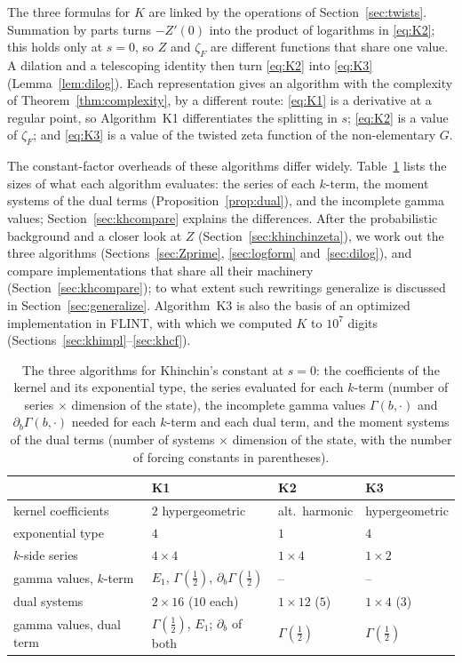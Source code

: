 \documentclass[11pt,reqno]{amsart}
\theoremstyle{definition}
\theoremstyle{remark}
\begin{document}
The three formulas for $K$ are linked by the operations of Section~\ref{sec:twists}.
Summation by parts turns $-Z'(0)$ into the product of logarithms in \eqref{eq:K2}; this holds only at $s = 0$, so $Z$
and $\zeta_F$ are different functions that share one value. A dilation and a telescoping identity then turn
\eqref{eq:K2} into \eqref{eq:K3} (Lemma~\ref{lem:dilog}). Each representation gives an algorithm with the complexity
of Theorem~\ref{thm:complexity}, by a different route: \eqref{eq:K1} is a derivative at a regular point, so
Algorithm~K1 differentiates the splitting in $s$; \eqref{eq:K2} is a value of $\zeta_F$; and \eqref{eq:K3} is a value
of the twisted zeta function of the non-elementary $G$.

The constant-factor overheads of these algorithms differ widely. Table~\ref{tab:khstates} lists the sizes of what each algorithm evaluates: the
series of each $k$-term, the moment systems of the dual terms (Proposition~\ref{prop:dual}), and the incomplete gamma
values; Section~\ref{sec:khcompare} explains the differences. After the probabilistic background and a closer look at
$Z$ (Section~\ref{sec:khinchinzeta}), we work out the three algorithms (Sections~\ref{sec:Zprime},
\ref{sec:logform} and~\ref{sec:dilog}), and compare implementations that share all their machinery
(Section~\ref{sec:khcompare}); to what extent such rewritings generalize is discussed in Section~\ref{sec:generalize}.
Algorithm~K3 is also the basis of an optimized implementation in FLINT, with which we computed $K$ to $10^7$ digits
(Sections~\ref{sec:khimpl}--\ref{sec:khcf}).

\begin{table}[t]
\centering\footnotesize
\caption{The three algorithms for Khinchin's constant at $s = 0$: the coefficients of the kernel and its exponential
type, the series evaluated for each $k$-term (number of series $\times$ dimension of the state), the incomplete gamma
values $\Gamma(b, \cdot)$ and $\partial_b\Gamma(b, \cdot)$ needed for each $k$-term and each dual term, and the moment
systems of the dual terms (number of systems
$\times$ dimension of the state, with the number of forcing constants in parentheses).}
\label{tab:khstates}
\setlength{\tabcolsep}{4pt}
\begin{tabular}{llll}
\toprule
 & K1 & K2 & K3 \\
\midrule
kernel coefficients & $2$ hypergeometric & alt.\ harmonic & hypergeometric \\
exponential type & $4$ & $1$ & $4$ \\
$k$-side series & $4\times4$ & $1\times4$ & $1\times2$ \\
gamma values, $k$-term & $E_1$, $\Gamma(\frac12)$, $\partial_b\Gamma(\frac12)$ & -- & -- \\
dual systems & $2\times16$ ($10$ each) & $1\times12$ ($5$) & $1\times4$ ($3$) \\
gamma values, dual term & $\Gamma(\frac12)$, $E_1$; $\partial_b$ of both & $\Gamma(\frac12)$ & $\Gamma(\frac12)$ \\
\bottomrule
\end{tabular}
\end{table}
\end{document}
